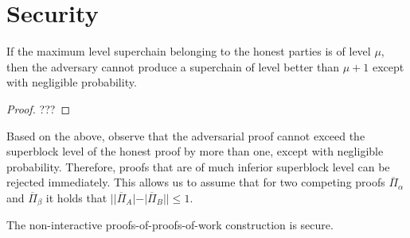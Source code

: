 \section{Security}

\begin{lemma}
    If the maximum level superchain belonging to the honest parties is of level
    $\mu$, then the adversary cannot produce a superchain of level better than
    $\mu + 1$ except with negligible probability.
\end{lemma}
\begin{proof}
    ???
\end{proof}

Based on the above, observe that the adversarial proof cannot exceed the
superblock level of the honest proof by more than one, except with negligible
probability. Therefore, proofs that are of much inferior superblock level can
be rejected immediately. This allows us to assume that for two competing proofs
$\overline{\Pi}_\alpha$ and $\overline{\Pi}_\beta$ it holds that
$||\overline{\Pi}_A| - |\overline{\Pi}_B|| \leq 1$.

\begin{theorem}
    The non-interactive proofs-of-proofs-of-work construction is secure.
\end{theorem}

